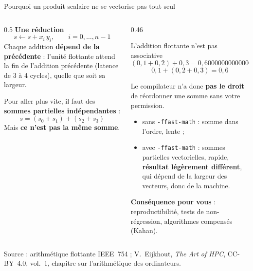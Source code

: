 \documentclass[8pt,aspectratio=169]{beamer}
\newcommand{\src}[1]{\vfill{\tiny\color{gray}Source : #1\par}}
\newcommand{\eij}{V.~Eijkhout, \emph{The Art of HPC}, CC-BY~4.0}
\begin{document}
\begin{frame}{Pourquoi un produit scalaire ne se vectorise pas tout seul}
\begin{columns}[T]
\begin{column}{0.5\textwidth}
\textbf{Une réduction}
\[
s \leftarrow s + x_i\,y_i,\qquad i=0,\dots,n-1
\]
Chaque addition \textbf{dépend de la précédente} : l'unité flottante attend la fin de l'addition précédente (latence de 3 à 4 cycles), quelle que soit sa largeur.

\medskip
Pour aller plus vite, il faut des \textbf{sommes partielles indépendantes} :
\[
s = (s_0 + s_1) + (s_2 + s_3)
\]
Mais \textbf{ce n'est pas la même somme}.
\end{column}
\begin{column}{0.46\textwidth}
\begin{block}{L'addition flottante n'est pas associative}
\[
(0{,}1 + 0{,}2) + 0{,}3 = 0{,}6000000000000001
\]
\[
0{,}1 + (0{,}2 + 0{,}3) = 0{,}6
\]
\end{block}
Le compilateur n'a donc \textbf{pas le droit} de réordonner une somme sans votre permission.
\begin{itemize}
\item sans \texttt{-ffast-math} : somme dans l'ordre, lente ;
\item avec \texttt{-ffast-math} : sommes partielles vectorielles, rapide, \textbf{résultat légèrement différent}, qui dépend de la largeur des vecteurs, donc de la machine.
\end{itemize}
\textbf{Conséquence pour vous} : reproductibilité, tests de non-régression, algorithmes compensés (Kahan).
\end{column}
\end{columns}
\src{arithmétique flottante IEEE~754 ; \eij{}, vol.~1, chapitre sur l'arithmétique des ordinateurs.}
\end{frame}
\end{document}
